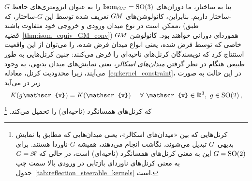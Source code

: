 بنا به ساختار، ما دوران‌های $\operatorname{Isom}_{G\mkern-1.4muM} = \operatorname{SO}(3)$ را به عنوان ایزومتری‌های حافظ $G$-ساختار داریم.
بنابراین، کانولوشن‌های $G\mkern-1.4muM$ تعریف شده توسط این $G$-ساختار، که ممکن است در نوع میدان ورودی و خروجی خود متفاوت باشند، (طبق قضیه~\ref{thm:isom_equiv_GM_conv}) هموردای دورانی خواهند بود.
کانولوشن $G\mkern-1.4muM$ خاصی که توسط \citet{ramasinghe2019representation} فرض شده، یعنی انواع میدان فرض شده، را می‌توان از این واقعیت استنتاج کرد که نویسندگان کرنل‌های ناحیه‌ای را فرض می‌کنند:
چنین کرنل‌هایی به طور طبیعی هنگام در نظر گرفتن \emph{میدان‌های اسکالر}، یعنی نمایش‌های میدان بدیهی، به وجود می‌آیند، زیرا محدودیت کرنل، معادله~\eqref{eq:kernel_constraint}، در این حالت به صورت زیر در می‌آید
\begin{align}\label{eq:Euc3_punctured_SO2_constraint}
	K(g\mkern1mu \mathscr{v}) = K(\mathscr{v}) \quad\ \forall\ \mathscr{v}\in\R^3,\ g\in\SO2 \,,
\end{align}
که کرنل‌های همسانگرد (ناحیه‌ای) را تحمیل می‌کند.%
\footnote{
	کرنل‌هایی که بین «میدان‌های اسکالر»، یعنی میدان‌هایی که مطابق با نمایش بدیهی~$G$ تبدیل می‌شوند، نگاشت انجام می‌دهند، همیشه $G$-ناوردا هستند.
	برای $G=\operatorname{SO}(2)$ این به معنی کرنل‌های همسانگرد (ناحیه‌ای) است، در حالی که $G=\mathscr{R}$ به معنی کرنل‌های ناوردای بازتابی در ورودی بالا سمت چپ جدول~\ref{tab:reflection_steerable_kernels} است.
}


